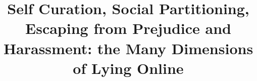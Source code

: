 \documentclass{sig-alternate}
\begin{document}
%

\title{Self Curation, Social Partitioning, Escaping from Prejudice and Harassment: the Many Dimensions of Lying Online}

%
%
%
%
%

%
\end{document}

